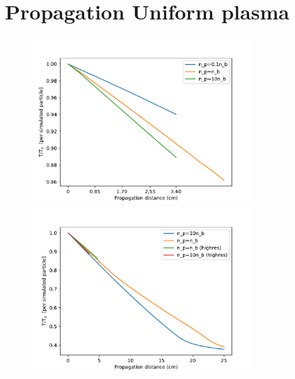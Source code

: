 \documentclass[%
onecolumn, notitlepage,
 amsmath,amssymb,
 aps,
]{article}
\begin{document}
\newpage
\section*{Propagation Uniform plasma}
\begin{figure}[!ht]
\centering
\includegraphics[width=0.75\textwidth]{Energy30pc_per_particle_past_sat_length.pdf}
\includegraphics[width=0.75\textwidth]{Energy30pc_per_particle_lowres.pdf}
\end{figure}
\end{document}
